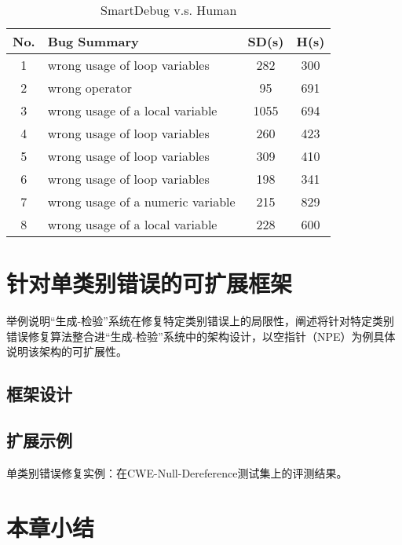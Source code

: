 \begin{table}
	\label{tab:sd-vs-human}
	\centering
	\caption{SmartDebug v.s. Human}
	\vspace{-0.8em}
	\begin{tabular}{|c|l|c|c|} \hline
		No.& Bug Summary 									& SD(s) & H(s)	\\	\hline
		1  & wrong usage of loop variables					& 282	& 300	\\	\hline
		2  & wrong operator									& 95	& 691	\\	\hline
		3  & wrong usage of a local variable				& 1055	& 694	\\  \hline
		4  & wrong usage of loop variables					& 260	& 423	\\	\hline
		5  & wrong usage of loop variables					& 309	& 410	\\	\hline
		6  & wrong usage of loop variables					& 198	& 341 	\\	\hline
		7 & wrong usage of a numeric variable				& 215	& 829	\\	\hline
		8 & wrong usage of a local variable				& 228	& 600	\\	\hline
		
	\end{tabular}
\end{table}

\section{针对单类别错误的可扩展框架}%
举例说明“生成-检验”系统在修复特定类别错误上的局限性，阐述将针对特定类别错误修复算法整合进“生成-检验”系统中的架构设计，以空指针（NPE）为例具体说明该架构的可扩展性。
\subsection{框架设计}%
\subsection{扩展示例}%
单类别错误修复实例：在CWE-Null-Dereference测试集上的评测结果。
\section{本章小结}%